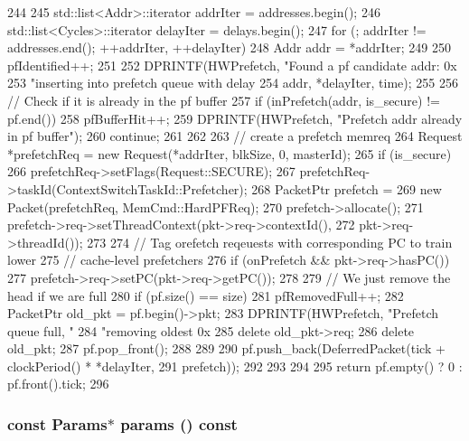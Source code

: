\begin{DoxyCode}
{{244 
245         std::list<Addr>::iterator addrIter = addresses.begin();
246         std::list<Cycles>::iterator delayIter = delays.begin();
247         for (; addrIter != addresses.end(); ++addrIter, ++delayIter) {
248             Addr addr = *addrIter;
249 
250             pfIdentified++;
251 
252             DPRINTF(HWPrefetch, "Found a pf candidate addr: 0x%
253                     "inserting into prefetch queue with delay %
254                     addr, *delayIter, time);
255 
256             // Check if it is already in the pf buffer
257             if (inPrefetch(addr, is_secure) != pf.end()) {
258                 pfBufferHit++;
259                 DPRINTF(HWPrefetch, "Prefetch addr already in pf buffer\n");
260                 continue;
261             }
262 
263             // create a prefetch memreq
264             Request *prefetchReq = new Request(*addrIter, blkSize, 0, masterId);
265             if (is_secure)
266                 prefetchReq->setFlags(Request::SECURE);
267             prefetchReq->taskId(ContextSwitchTaskId::Prefetcher);
268             PacketPtr prefetch =
269                 new Packet(prefetchReq, MemCmd::HardPFReq);
270             prefetch->allocate();
271             prefetch->req->setThreadContext(pkt->req->contextId(),
272                                             pkt->req->threadId());
273 
274             // Tag orefetch reqeuests with corresponding PC to train lower
275             // cache-level prefetchers
276             if (onPrefetch && pkt->req->hasPC())
277                 prefetch->req->setPC(pkt->req->getPC());
278 
279             // We just remove the head if we are full
280             if (pf.size() == size) {
281                 pfRemovedFull++;
282                 PacketPtr old_pkt = pf.begin()->pkt;
283                 DPRINTF(HWPrefetch, "Prefetch queue full, "
284                         "removing oldest 0x%
285                 delete old_pkt->req;
286                 delete old_pkt;
287                 pf.pop_front();
288             }
289 
290             pf.push_back(DeferredPacket(tick + clockPeriod() * *delayIter,
291                                         prefetch));
292         }
293     }
294 
295     return pf.empty() ? 0 : pf.front().tick;
296 }
\end{DoxyCode}
\hypertarget{classBasePrefetcher_acd3c3feb78ae7a8f88fe0f110a718dff}{
\subsubsection[{params}]{\setlength{\rightskip}{0pt plus 5cm}const {\bf Params}$\ast$ params () const}}
\label{classBasePrefetcher_acd3c3feb78ae7a8f88fe0f110a718dff}


